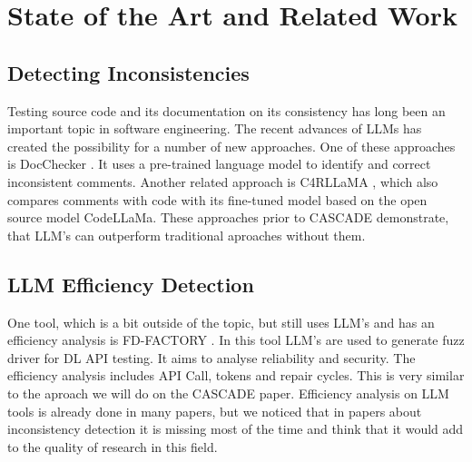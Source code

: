 \section{State of the Art and Related Work}
\label{sec:state-of-the-art}



\subsection{Detecting Inconsistencies}

Testing source code and its documentation on its consistency has long been an important topic in software engineering.
The recent advances of LLMs has created the possibility for a number of new approaches. 
One of these approaches is DocChecker \cite{DocChecker}. 
It uses a pre-trained language model to identify and correct inconsistent comments.
Another related approach is C4RLLaMA \cite{C4RLLAMA}, which also compares comments with code with its fine-tuned model based on the open source model CodeLLaMa.
These approaches prior to CASCADE \cite{Kiecker_2026} demonstrate, that LLM's can outperform traditional aproaches without them.

\subsection{LLM Efficiency Detection}


One tool, which is a bit outside of the topic, but still uses LLM's and has an efficiency analysis is FD-FACTORY \cite{FD-FACTORY}.
In this tool LLM's are used to generate fuzz driver for DL API testing.
It aims to analyse reliability and security. The efficiency analysis includes API Call, tokens and repair cycles.
This is very similar to the aproach we will do on the CASCADE paper.
Efficiency analysis on LLM tools is already done in many papers, but we noticed that in papers about inconsistency detection it is missing most of the time and think that it would add to the quality of research in this field.
 
